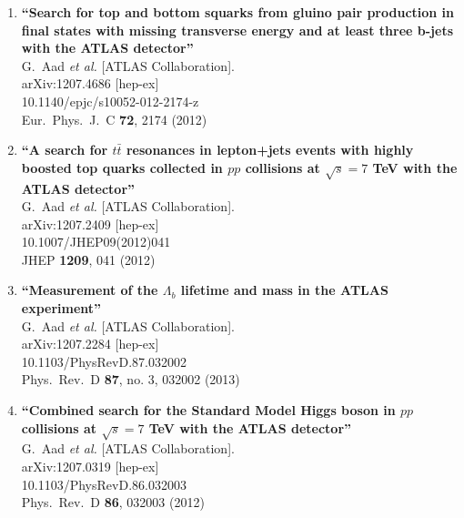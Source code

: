 \documentclass{article}
\begin{document}
\begin{enumerate}
\item%
{\bf ``Search for top and bottom squarks from gluino pair production in final states with missing transverse energy and at least three b-jets with the ATLAS detector''}
  \\{}G.~Aad {\it et al.}  [ATLAS Collaboration].
  \\{}arXiv:1207.4686 [hep-ex]
    \\{}10.1140/epjc/s10052-012-2174-z
\\{}Eur.\ Phys.\ J.\ C {\bf 72}, 2174 (2012) %


\item%
{\bf ``A search for $t\bar{t}$ resonances in lepton+jets events with highly boosted top quarks collected in $pp$ collisions at $\sqrt{s} = 7$ TeV with the ATLAS detector''}
  \\{}G.~Aad {\it et al.}  [ATLAS Collaboration].
  \\{}arXiv:1207.2409 [hep-ex]
    \\{}10.1007/JHEP09(2012)041
\\{}JHEP {\bf 1209}, 041 (2012) %


\item%
{\bf ``Measurement of the $\Lambda_b$ lifetime and mass in the ATLAS experiment''}
  \\{}G.~Aad {\it et al.}  [ATLAS Collaboration].
  \\{}arXiv:1207.2284 [hep-ex]
    \\{}10.1103/PhysRevD.87.032002
\\{}Phys.\ Rev.\ D {\bf 87}, no. 3, 032002 (2013) %


\item%
{\bf ``Combined search for the Standard Model Higgs boson in $pp$ collisions at $\sqrt{s} = 7$ TeV with the ATLAS detector''}
  \\{}G.~Aad {\it et al.}  [ATLAS Collaboration].
  \\{}arXiv:1207.0319 [hep-ex]
    \\{}10.1103/PhysRevD.86.032003
\\{}Phys.\ Rev.\ D {\bf 86}, 032003 (2012) %



\end{enumerate}
\end{document}
